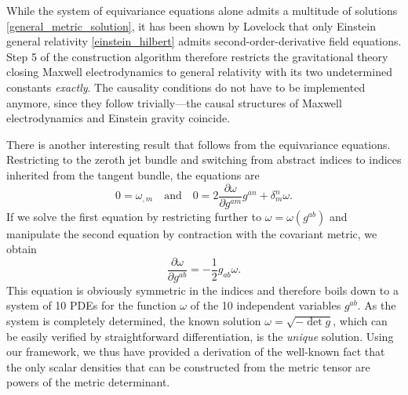 While the system of equivariance equations alone admits a multitude of solutions \eqref{general_metric_solution}, it has been shown by Lovelock\cite{} that only Einstein general relativity \eqref{einstein_hilbert} admits second-order-derivative field equations. Step 5 of the construction algorithm therefore restricts the gravitational theory closing Maxwell electrodynamics to general relativity with its two undetermined constants \emph{exactly}. The causality conditions do not have to be implemented anymore, since they follow trivially---the causal structures of Maxwell electrodynamics and Einstein gravity coincide\cite{??}.

There is another interesting result that follows from the equivariance equations. Restricting to the zeroth jet bundle and switching from abstract indices to indices inherited from the tangent bundle, the equations are
\begin{equation}\label{metric_order_0_eq}
  0 = \omega_{,m}\quad\text{and}\quad 0 = 2\frac{\partial\omega}{\partial g^{am}} g^{an} + \delta^n_m \omega.
\end{equation}
If we solve the first equation by restricting further to $\omega=\omega(g^{ab})$ and manipulate the second equation by contraction with the covariant metric, we obtain
\begin{equation}
  \frac{\partial\omega}{\partial g^{ab}} = -\frac{1}{2} g_{ab} \omega.
\end{equation}
This equation is obviously symmetric in the indices and therefore boils down to a system of 10 PDEs for the function $\omega$ of the 10 independent variables $g^{ab}$. As the system is completely determined, the known solution $\omega=\sqrt{-\operatorname{det}g}$, which can be easily verified by straightforward differentiation, is the \emph{unique} solution. Using our framework, we thus have provided a derivation of the well-known fact that the only scalar densities that can be constructed from the metric tensor are powers of the metric determinant.

